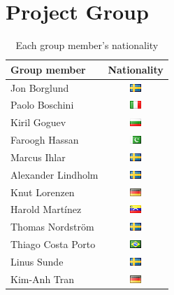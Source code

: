 \section{Project Group}

\begin{table}
\centering
\begin{tabular}{|l|c|}
\hline
Group member & Nationality \\ \hline\hline
Jon Borglund & \includegraphics{graphics/se} \\
Paolo Boschini & \includegraphics{graphics/it} \\
Kiril Goguev & \includegraphics{graphics/bg} \\
Faroogh Hassan & \includegraphics{graphics/pk} \\
Marcus Ihlar & \includegraphics{graphics/se} \\
Alexander Lindholm & \includegraphics{graphics/se} \\
Knut Lorenzen & \includegraphics{graphics/de} \\
Harold Mart\'{i}nez & \includegraphics{graphics/ve} \\
Thomas Nordstr\"om & \includegraphics{graphics/se} \\
Thiago Costa Porto & \includegraphics{graphics/br} \\
Linus Sunde & \includegraphics{graphics/se} \\
Kim-Anh Tran & \includegraphics{graphics/de} \\
\hline
\end{tabular}
\caption{Each group member's nationality}\label{fig:nationality}
\end{table}

